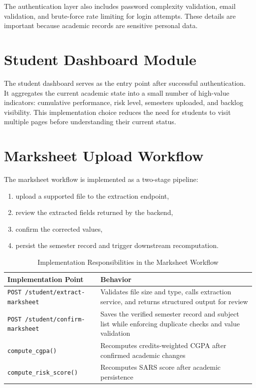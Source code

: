 The authentication layer also includes password complexity validation, email validation, and brute-force rate limiting for login attempts. These details are important because academic records are sensitive personal data.

\section{Student Dashboard Module}
The student dashboard serves as the entry point after successful authentication. It aggregates the current academic state into a small number of high-value indicators: cumulative performance, risk level, semesters uploaded, and backlog visibility. This implementation choice reduces the need for students to visit multiple pages before understanding their current status.

\section{Marksheet Upload Workflow}
The marksheet workflow is implemented as a two-stage pipeline:
\begin{enumerate}[leftmargin=*]
\item upload a supported file to the extraction endpoint,
\item review the extracted fields returned by the backend,
\item confirm the corrected values,
\item persist the semester record and trigger downstream recomputation.
\end{enumerate}

\begin{table}[H]
\centering
\caption{Implementation Responsibilities in the Marksheet Workflow}
\begin{tabularx}{\textwidth}{>{\raggedright\arraybackslash}p{} >{\raggedright\arraybackslash}X}
\toprule
\textbf{Implementation Point} & \textbf{Behavior} \\
\midrule
\texttt{POST /student/extract-marksheet} & Validates file size and type, calls extraction service, and returns structured output for review \\
\texttt{POST /student/confirm-marksheet} & Saves the verified semester record and subject list while enforcing duplicate checks and value validation \\
\texttt{compute\_cgpa()} & Recomputes credits-weighted CGPA after confirmed academic changes \\
\texttt{compute\_risk\_score()} & Recomputes SARS score after academic persistence \\
\bottomrule
\end{tabularx}
\end{table}

